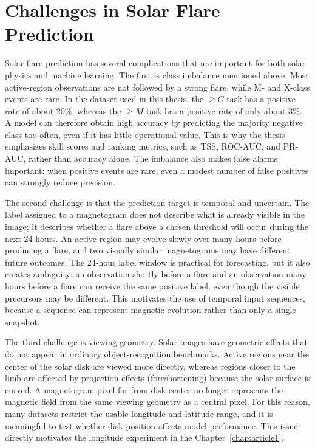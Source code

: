 \section{Challenges in Solar Flare Prediction}

Solar flare prediction has several complications that are important for both solar physics and machine learning. The first is class imbalance mentioned above. Most active-region observations are not followed by a strong flare, while M- and X-class events are rare. In the dataset used in this thesis, the $\geq C$ task has a positive rate of about 20\%, whereas the $\geq M$ task has a positive rate of only about 3\%. A model can therefore obtain high accuracy by predicting the majority negative class too often, even if it has little operational value. This is why the thesis emphasizes skill scores and ranking metrics, such as TSS, ROC-AUC, and PR-AUC, rather than accuracy alone. The imbalance also makes false alarms important: when positive events are rare, even a modest number of false positives can strongly reduce precision.

The second challenge is that the prediction target is temporal and uncertain. The label assigned to a magnetogram does not describe what is already visible in the image; it describes whether a flare above a chosen threshold will occur during the next 24 hours. An active region may evolve slowly over many hours before producing a flare, and two visually similar magnetograms may have different future outcomes. The 24-hour label window is practical for forecasting, but it also creates ambiguity: an observation shortly before a flare and an observation many hours before a flare can receive the same positive label, even though the visible precursors may be different. This motivates the use of temporal input sequences, because a sequence can represent magnetic evolution rather than only a single snapshot.

The third challenge is viewing geometry. Solar images have geometric effects that do not appear in ordinary object-recognition benchmarks. Active regions near the center of the solar disk are viewed more directly, whereas regions closer to the limb are affected by projection effects (foreshortening) because the solar surface is curved. A magnetogram pixel far from disk center no longer represents the magnetic field from the same viewing geometry as a central pixel. For this reason, many datasets restrict the usable longitude and latitude range, and it is meaningful to test whether disk position affects model performance. This issue directly motivates the longitude experiment in the Chapter~\ref{chap:article1}.

